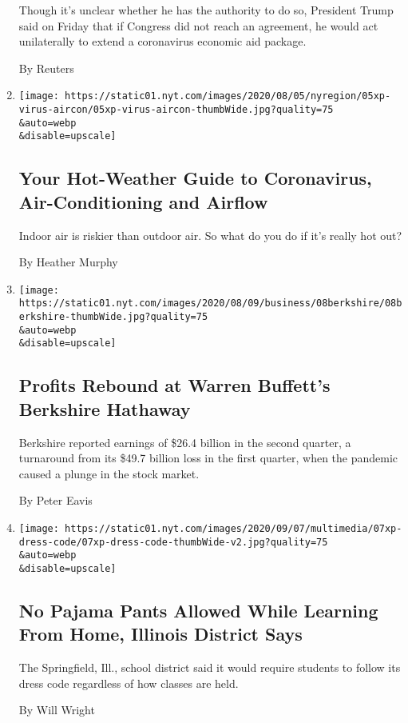 \begin{enumerate}
  Though it's unclear whether he has the authority to do so, President
  Trump said on Friday that if Congress did not reach an agreement, he
  would act unilaterally to extend a coronavirus economic aid package.

  By Reuters
\item
  \href{/2020/08/08/science/coronavirus-spread-air-conditioning.html}{}

  \texttt{[image: https://static01.nyt.com/images/2020/08/05/nyregion/05xp-virus-aircon/05xp-virus-aircon-thumbWide.jpg?quality=75\\\&auto=webp\\\&disable=upscale]}

  \hypertarget{your-hot-weather-guide-to-coronavirus-air-conditioning-and-airflow}{%
  \subsection{Your Hot-Weather Guide to Coronavirus, Air-Conditioning
  and
  Airflow}\label{your-hot-weather-guide-to-coronavirus-air-conditioning-and-airflow}}

  Indoor air is riskier than outdoor air. So what do you do if it's
  really hot out?

  By Heather Murphy
\item
  \href{/2020/08/08/business/berkshire-hathaway-earnings-warren-buffett.html}{}

  \texttt{[image: https://static01.nyt.com/images/2020/08/09/business/08berkshire/08berkshire-thumbWide.jpg?quality=75\\\&auto=webp\\\&disable=upscale]}

  \hypertarget{profits-rebound-at-warren-buffetts-berkshire-hathaway}{%
  \subsection{Profits Rebound at Warren Buffett's Berkshire
  Hathaway}\label{profits-rebound-at-warren-buffetts-berkshire-hathaway}}

  Berkshire reported earnings of \$26.4 billion in the second quarter, a
  turnaround from its \$49.7 billion loss in the first quarter, when the
  pandemic caused a plunge in the stock market.

  By Peter Eavis
\item
  \href{/2020/08/08/us/pajamas-school-springfield-dress-code.html}{}

  \texttt{[image: https://static01.nyt.com/images/2020/09/07/multimedia/07xp-dress-code/07xp-dress-code-thumbWide-v2.jpg?quality=75\\\&auto=webp\\\&disable=upscale]}

  \hypertarget{no-pajama-pants-allowed-while-learning-from-home-illinois-district-says}{%
  \subsection{No Pajama Pants Allowed While Learning From Home, Illinois
  District
  Says}\label{no-pajama-pants-allowed-while-learning-from-home-illinois-district-says}}

  The Springfield, Ill., school district said it would require students
  to follow its dress code regardless of how classes are held.

  By Will Wright
\end{enumerate}

